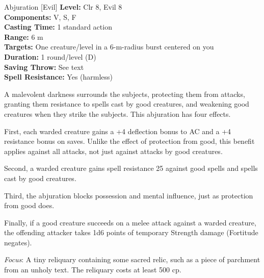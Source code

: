 {Abjuration [Evil]}
{
	\textbf{Level:}
	Clr 8, Evil 8\\
	\textbf{Components:}
	V, S, F\\
	\textbf{Casting Time:}
	1 standard action\\
	\textbf{Range:}
	6 m\\
	\textbf{Targets:}
	One creature/level in a 6-m-radius burst centered on you\\
	\textbf{Duration:}
	1 round/level (D)\\
	\textbf{Saving Throw:}
	See text\\
	\textbf{Spell Resistance:}
	Yes (harmless)\\
}
{
	A malevolent darkness surrounds the subjects, protecting them from attacks, granting them resistance to spells cast by good creatures, and weakening good creatures when they strike the subjects. This abjuration has four effects.

	First, each warded creature gains a +4 deflection bonus to AC and a +4 resistance bonus on saves. Unlike the effect of protection from good, this benefit applies against all attacks, not just against attacks by good creatures.

	Second, a warded creature gains spell resistance 25 against good spells and spells cast by good creatures.

	Third, the abjuration blocks possession and mental influence, just as protection from good does.

	Finally, if a good creature succeeds on a melee attack against a warded creature, the offending attacker takes 1d6 points of temporary Strength damage (Fortitude negates).

	\textit{Focus}:
	A tiny reliquary containing some sacred relic, such as a piece of parchment from an unholy text. The reliquary costs at least 500 cp.

}
